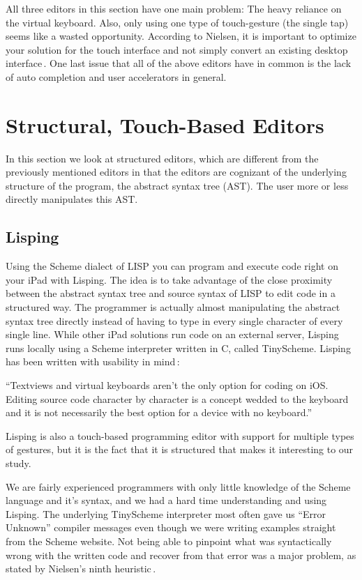 All three editors in this section have one main problem: The heavy reliance on the virtual keyboard. Also, only using one type of touch-gesture (the single tap) seems like a wasted opportunity.
According to Nielsen, it is important to optimize your solution for the touch
interface and not simply convert an existing desktop interface\,\cite[p 26, p
41]{nielsen2013mobile}.
One last issue that all of the above editors have in common is the lack of auto completion and user accelerators in general.

\section{Structural, Touch-Based Editors}
In this section we look at structured editors, which are different from the previously mentioned editors in that the editors are cognizant of the underlying structure of the program, the abstract syntax tree (AST). The user more or less directly manipulates this AST\@.

\subsection{Lisping}
\label{subsub:Lisping}
Using the Scheme dialect of LISP you can program and execute code right on your iPad with Lisping. The idea is to take advantage of the close proximity between the abstract syntax tree and source syntax of LISP to edit code in a structured way. The programmer is actually almost manipulating the abstract syntax tree directly instead of having to type in every single character of every single line. While other iPad solutions run code on an external server, Lisping runs locally using a Scheme interpreter written in C, called TinyScheme. Lisping has been written with usability in mind\,\cite{lisping}: 

``Textviews and virtual keyboards aren't the only option for coding on iOS\@. Editing source code character by character is a concept wedded to the keyboard and it is not necessarily the best option for a device with no keyboard.''

Lisping is also a touch-based programming editor with support for multiple types of gestures, but it is the fact that it is structured that makes it interesting to our study.

We are fairly experienced programmers with only little knowledge of the Scheme language and it's syntax, and we had a hard time understanding and using Lisping. The underlying TinyScheme interpreter most often gave us “Error Unknown” compiler messages even though we were writing examples straight from the Scheme website. Not being able to pinpoint what was syntactically wrong with the written code and recover from that error was a major problem, as stated by Nielsen's ninth heuristic\,\cite{nielsen1990heuristic}.


